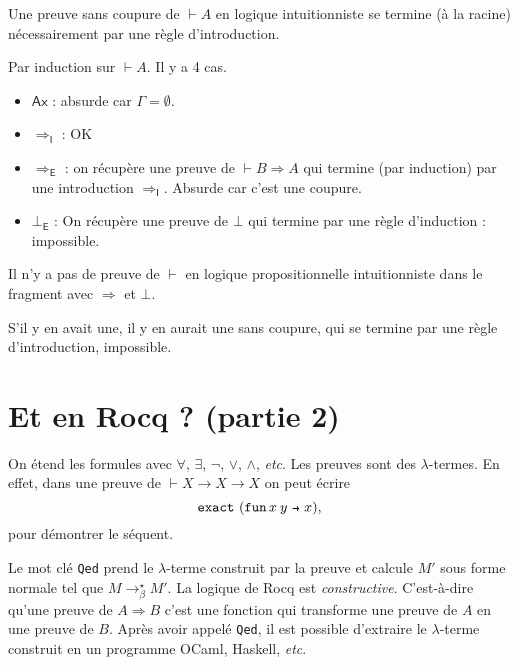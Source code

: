 \documentclass[./main]{subfiles}
\begin{document}
  \begin{lem}
    Une preuve sans coupure de $\vdash A$ en logique intuitionniste se termine (à la racine) nécessairement par une règle d'introduction.
  \end{lem}
  \begin{prv}
    Par induction sur $\vdash A$. Il y a 4 cas.
    \begin{itemize}
      \item $\mathsf{Ax}$ : absurde car $\Gamma = \emptyset$.
      \item $\Rightarrow_\mathsf{I}$ : OK
      \item $\Rightarrow_\mathsf{E}$ : on récupère une preuve de $\vdash B \Rightarrow A$ qui termine (par induction) par une introduction $\Rightarrow_\mathsf{I}$. Absurde car c'est une coupure.
      \item $\bot_\mathsf{E}$ : On récupère une preuve de $\bot$ qui termine par une règle d'induction : impossible.
    \end{itemize}
  \end{prv}

  \begin{crlr}
    Il n'y a pas de preuve de $\vdash$ en logique propositionnelle intuitionniste dans le fragment avec $\Rightarrow$ et  $\bot$.
  \end{crlr}
  \begin{prv}
    S'il y en avait une, il y en aurait une sans coupure, qui se termine par une règle d'introduction, impossible.
  \end{prv}

  \section{Et en Rocq ? (partie 2)}

  On étend les formules avec $\forall$, $\exists$, $\lnot$, $\lor$, $\land$, \textit{etc}.
  Les preuves sont des $\lambda$-termes.
  En effet, dans une preuve de $\vdash X \to X \to X$ on peut écrire \[
    \mathtt{exact}\ (\fun{x\: y}{x})
  ,\]
  pour démontrer le séquent.

  Le mot clé \texttt{Qed} prend le $\lambda$-terme construit par la preuve et calcule $M'$ sous forme normale tel que $M \to_\beta^\star M'$.
  La logique de Rocq est \textit{constructive}. C'est-à-dire qu'une preuve de $A \Rightarrow B$ c'est une fonction qui transforme une preuve de $A$ en une preuve de $B$.
  Après avoir appelé  \texttt{Qed}, il est possible d'extraire le $\lambda$-terme construit en un programme OCaml, Haskell, \textit{etc}.
\end{document}
